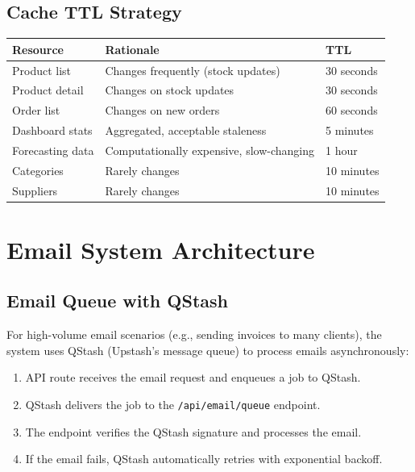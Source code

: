 \documentclass[12pt,a4paper]{report}
\begin{document}
\subsection{Cache TTL Strategy}

\begin{center}
\begin{tabularx}{\textwidth}{lXl}
  \toprule
  \textbf{Resource} & \textbf{Rationale} & \textbf{TTL} \\
  \midrule
  Product list      & Changes frequently (stock updates) & 30 seconds \\
  Product detail    & Changes on stock updates & 30 seconds \\
  Order list        & Changes on new orders & 60 seconds \\
  Dashboard stats   & Aggregated, acceptable staleness & 5 minutes \\
  Forecasting data  & Computationally expensive, slow-changing & 1 hour \\
  Categories        & Rarely changes & 10 minutes \\
  Suppliers         & Rarely changes & 10 minutes \\
  \bottomrule
\end{tabularx}
\end{center}

\section{Email System Architecture}

\subsection{Email Queue with QStash}

For high-volume email scenarios (e.g., sending invoices to many clients), the system uses QStash (Upstash's message queue) to process emails asynchronously:

\begin{enumerate}[leftmargin=1.5em]
  \item API route receives the email request and enqueues a job to QStash.
  \item QStash delivers the job to the \texttt{/api/email/queue} endpoint.
  \item The endpoint verifies the QStash signature and processes the email.
  \item If the email fails, QStash automatically retries with exponential backoff.
\end{enumerate}
\end{document}

